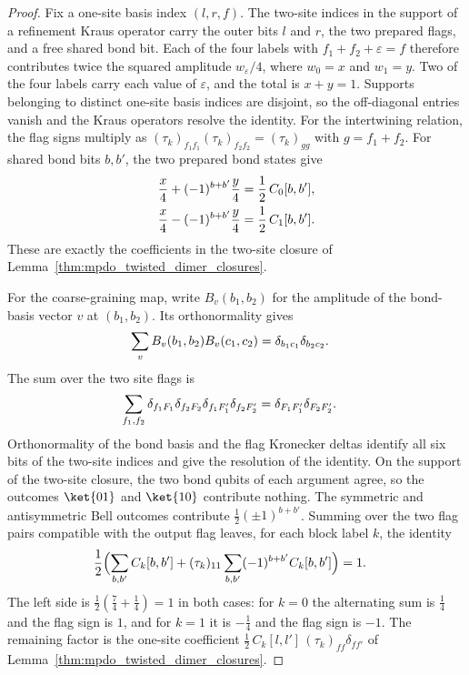 \begin{proof}\leanok
    Fix a one-site basis index $(l,r,f)$. The two-site indices in the
    support of a refinement Kraus operator carry the outer bits $l$ and
    $r$, the two prepared flags, and a free shared bond bit. Each of the
    four labels with $f_1+f_2+\varepsilon=f$ therefore contributes twice
    the squared amplitude $w_\varepsilon/4$, where $w_0=x$ and $w_1=y$.
    Two of the four labels carry each value of $\varepsilon$, and the
    total is $x+y=1$. Supports belonging to distinct one-site basis
    indices are disjoint, so the off-diagonal entries vanish and the
    Kraus operators resolve the identity.
    For the intertwining relation, the flag signs multiply as
    $(\tau_k)_{f_1f_1}(\tau_k)_{f_2f_2}=(\tau_k)_{gg}$ with $g=f_1+f_2$.
    For shared bond bits $b,b'$, the two prepared bond states give
    \begin{align}
        \frac{x}{4}+(-1)^{b+b'}\frac{y}{4} & =\frac12\,C_0[b,b'],
        \notag                                                    \\
        \frac{x}{4}-(-1)^{b+b'}\frac{y}{4} & =\frac12\,C_1[b,b'].
        \notag
    \end{align}
    These are exactly the coefficients in the two-site closure of
    Lemma~\ref{thm:mpdo_twisted_dimer_closures}.

    For the coarse-graining map, write $B_v(b_1,b_2)$ for the amplitude of
    the bond-basis vector $v$ at $(b_1,b_2)$. Its orthonormality gives
    \begin{align}
        \sum_v B_v(b_1,b_2)B_v(c_1,c_2)
         & =\delta_{b_1c_1}\delta_{b_2c_2}.
        \notag
    \end{align}
    The sum over the two site flags is
    \begin{align}
        \sum_{f_1,f_2}
        \delta_{f_1F_1}\delta_{f_2F_2}
        \delta_{f_1F'_1}\delta_{f_2F'_2}
         & =\delta_{F_1F'_1}\delta_{F_2F'_2}.
        \notag
    \end{align}
    Orthonormality of the bond basis and the flag Kronecker deltas
    identify all six bits of the two-site indices and give the resolution
    of the identity. On the support of the two-site closure, the two bond
    qubits of each argument agree, so the outcomes $\ket{01}$ and
    $\ket{10}$ contribute nothing. The symmetric and antisymmetric Bell
    outcomes contribute $\frac12(\pm1)^{b+b'}$.
    Summing over the two flag pairs compatible with the output flag
    leaves, for each block label $k$, the identity
    \begin{align}
        \frac12\Bigl(\sum_{b,b'}C_k[b,b']
        +(\tau_k)_{11}\sum_{b,b'}(-1)^{b+b'}C_k[b,b']\Bigr) & =1.
        \notag
    \end{align}
    The left side is $\frac12(\frac74+\frac14)=1$ in both cases:
    for $k=0$ the alternating sum is $\frac14$ and the flag sign is $1$,
    and for $k=1$ it is $-\frac14$ and the flag sign is $-1$.
    The remaining factor is the one-site coefficient
    $\frac12\,C_k[l,l']\,(\tau_k)_{ff} \delta_{ff'}$ of
    Lemma~\ref{thm:mpdo_twisted_dimer_closures}.
\end{proof}
